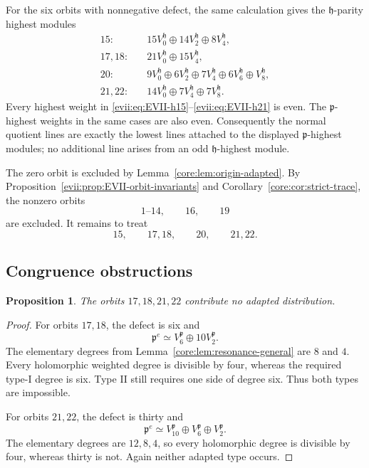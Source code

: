 \documentclass[11pt,reqno]{amsart}
\numberwithin{equation}{section}
\newtheorem{proposition}[theorem]{Proposition}
\theoremstyle{definition}
\theoremstyle{remark}
\newcommand{\fh}{\mathfrak h}
\newcommand{\fp}{\mathfrak p}
\begin{document}
For the six orbits with nonnegative defect, the same calculation gives the
$\fh$-parity highest modules
\begin{align}
15:&\quad 15V_0^{\fh}\oplus14V_2^{\fh}\oplus8V_4^{\fh},
\label{evii:eq:EVII-h15}\\
17,18:&\quad 21V_0^{\fh}\oplus15V_4^{\fh},
\label{evii:eq:EVII-h17}\\
20:&\quad 9V_0^{\fh}\oplus6V_2^{\fh}\oplus7V_4^{\fh}
       \oplus6V_6^{\fh}\oplus V_8^{\fh},
\label{evii:eq:EVII-h20}\\
21,22:&\quad 14V_0^{\fh}\oplus7V_4^{\fh}\oplus7V_8^{\fh}.
\label{evii:eq:EVII-h21}
\end{align}
Every highest weight in \eqref{evii:eq:EVII-h15}--\eqref{evii:eq:EVII-h21} is even.
The $\fp$-highest weights in the same cases are also even.  Consequently the
normal quotient lines are exactly the lowest lines attached to the displayed
$\fp$-highest modules; no additional line arises from an odd
$\fh$-highest module.

The zero orbit is excluded by Lemma~\ref{core:lem:origin-adapted}.  By
Proposition~\ref{evii:prop:EVII-orbit-invariants} and
Corollary~\ref{core:cor:strict-trace}, the nonzero orbits
\begin{equation}\label{evii:eq:EVII-strict-orbits}
 1\text{--}14,\qquad16,\qquad19
\end{equation}
are excluded.  It remains to treat
\begin{equation}\label{evii:eq:EVII-remaining-orbits}
 15,\qquad17,18,\qquad20,\qquad21,22.
\end{equation}

\subsection{Congruence obstructions}

\begin{proposition}\label{evii:prop:EVII-congruence}
The orbits $17,18,21,22$ contribute no adapted distribution.
\end{proposition}

\begin{proof}
For orbits $17,18$, the defect is six and
\[
 \fp^e\simeq V_6^{\fp}\oplus10V_2^{\fp}.
\]
The elementary degrees from Lemma~\ref{core:lem:resonance-general} are $8$ and
$4$.  Every holomorphic weighted degree is divisible by four, whereas the
required type-I degree is six.  Type II still requires one side of degree six.
Thus both types are impossible.

For orbits $21,22$, the defect is thirty and
\[
 \fp^e\simeq V_{10}^{\fp}\oplus V_6^{\fp}\oplus V_2^{\fp}.
\]
The elementary degrees are $12,8,4$, so every holomorphic degree is divisible
by four, whereas thirty is not.  Again neither adapted type occurs.
\end{proof}
\end{document}
